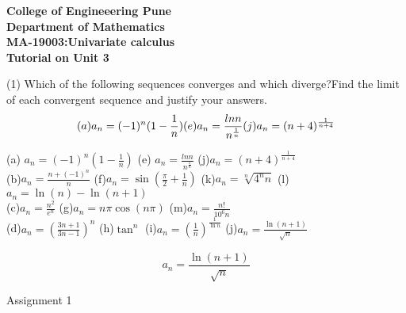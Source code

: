 \documentclass[12pt]{article}
\begin{document}
\begin{large}
\begin{center}
\textbf{College of Engineeering Pune}\\
\textbf{Department of Mathematics}\\
\textbf{MA-19003:Univariate calculus}\\
\textbf{Tutorial on Unit 3}\\
\end{center}
\end{large}

(1) Which of the following sequences converges and which diverge?Find the limit of each convergent sequence and justify your answers.
\\
\begin{displaymath}
(a) a_n=(-1)^n(1-\frac{1}{n}) 
(e) a_n=\frac{ln n}{n^\frac{1}{n}}    (j)a_n=(n+4)^\frac{1}{n+4}\\
\end{displaymath}

(a) $a_n=(-1)^n(1-\frac{1}{n})$ (e) $a_n=\frac{ln n}{n^\frac{1}{n}}$  (j)$a_n=(n+4)^\frac{1}{n+4}$\\

(b)$a_n=\frac{n+(-1)^n}{n}$ (f)$a_n=\sin(\frac{\pi}{2}+\frac{1}{n})$ (k)$a_n=\sqrt[n]{4^nn}$
(l)$a_n=\ln(n) - \ln(n+1)$\\

(c)$a_n=\frac{n^2}{e^n}$ (g)$a_n=n\pi\cos(n\pi)$ (m)$a_n=\frac{n!}{10^6n}$  \\

(d)$a_n=(\frac{3n+1}{3n-1})^n$ (h)$\tan^n$ (i)$a_n=(\frac{1}{n})^\frac{1}{\ln n}$ (j)$a_n=\frac{\ln(n+1)}{\sqrt{n}}$

\begin{displaymath}
a_n=\frac{\ln(n+1)}{\sqrt{n}}
\end{displaymath}




\begin{titlepage}
Assignment 1
\end{titlepage}
\end{document}
